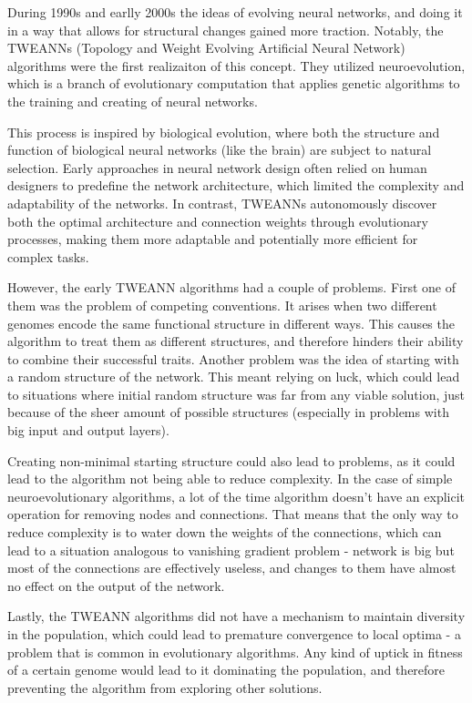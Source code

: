\documentclass{article}
\begin{document}
During 1990s and earlly 2000s the ideas of evolving neural networks, and doing it in a way that allows for structural changes gained more traction. 
Notably, the TWEANNs (Topology and Weight Evolving Artificial Neural Network) algorithms were the first realizaiton of this concept.
They utilized neuroevolution, which is a branch of evolutionary computation that applies genetic algorithms to the training and creating of neural networks.

This process is inspired by biological evolution, where both the structure and function of biological neural networks (like the brain)
are subject to natural selection. 
Early approaches in neural network design often relied on human designers to predefine the network architecture,
which limited the complexity and adaptability of the networks. In contrast, TWEANNs autonomously discover both the optimal architecture and connection weights through evolutionary processes, making them more adaptable and potentially more efficient for complex tasks.
\par However, the early TWEANN algorithms had a couple of problems. 
First one of them was the problem of competing conventions. It arises when two different genomes encode the same
functional structure in different ways. This causes the algorithm to treat them as different structures, and therefore hinders
their ability to combine their successful traits.
Another problem was the idea of starting with a random structure of the network.
This meant relying on luck, which could lead to situations where initial random structure was far from any viable solution,
just because of the sheer amount of possible structures (especially in problems with big input and output layers).

Creating non-minimal starting structure could also lead to problems, as it could lead to the algorithm not being able to reduce complexity.
In the case of simple neuroevolutionary algorithms, a lot of the time algorithm doesn't have an explicit operation for removing nodes and
connections. That means that the only way to reduce complexity is to water down the weights of the connections, which can lead to a situation
analogous to vanishing gradient problem - network is big but most of the connections are effectively useless, and changes to them have 
almost no effect on the output of the network. 

Lastly, the TWEANN algorithms did not have a mechanism to maintain diversity in the population,
which could lead to premature convergence to local optima -  a problem that is common in evolutionary algorithms.
Any kind of uptick in fitness of a certain genome would lead to it dominating the population, and therefore preventing the algorithm from exploring other solutions.  
\end{document}
